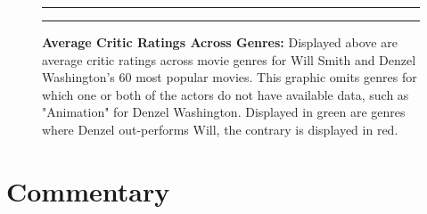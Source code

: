 \documentclass[]{article}
\begin{document}
\begin{figure}[!ht]
 \label{fig:one-graphic}
    \begin{center}
    \end{center}
    \hrule
      \vspace{2mm}
    \caption{ \textbf{Average Critic Ratings Across Genres:} \newline \footnotesize{ Displayed above are average critic ratings across movie genres for Will Smith and Denzel Washington's 60 most popular movies. This graphic omits genres for which one or both of the actors do not have available data, such as "Animation" for Denzel Washington. \newline \newline Displayed in green are genres where Denzel out-performs Will, the contrary is displayed in red.}  }
    \vspace{2mm}
    \hrule
\end{figure}

\section{Commentary}
\label{sec:commentary}
\doublespacing
\end{document}
